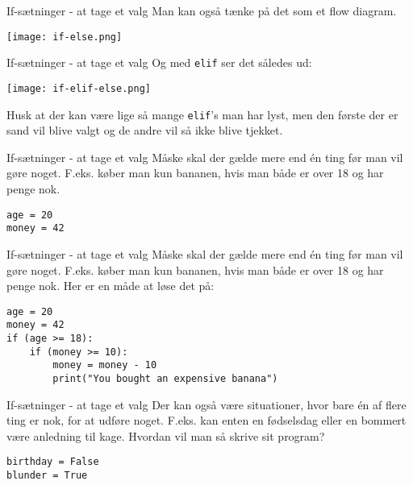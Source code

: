 \documentclass[main.tex]{subfiles}
\begin{document}
\begin{frame}[fragile]{If-sætninger - at tage et valg}
Man kan også tænke på det som et flow diagram.
\begin{center}
\texttt{[image: if-else.png]}
\end{center}

\end{frame}


\begin{frame}[fragile]{If-sætninger - at tage et valg}
Og med \texttt{elif} ser det således ud:
\begin{center}
	\texttt{[image: if-elif-else.png]}
\end{center}

Husk at der kan være lige så mange \texttt{elif}'s man har lyst, men den første der er sand vil blive valgt og de andre vil så ikke blive tjekket.

\end{frame}


\begin{frame}[fragile]{If-sætninger - at tage et valg}
	Måske skal der gælde mere end én ting før man vil gøre noget. F.eks. køber man kun bananen, hvis man både er over 18 og har penge nok. 
	\begin{lstlisting}[style=python]
age = 20
money = 42
	\end{lstlisting}
\end{frame}

\begin{frame}[fragile]{If-sætninger - at tage et valg}
	Måske skal der gælde mere end én ting før man vil gøre noget. F.eks. køber man kun bananen, hvis man både er over 18 og har penge nok. Her er en måde at løse det på:
	\begin{lstlisting}[style=python]
age = 20
money = 42
if (age >= 18):
	if (money >= 10):
		money = money - 10
		print("You bought an expensive banana")
	\end{lstlisting}
\end{frame}

\begin{frame}[fragile]{If-sætninger - at tage et valg}
	Der kan også være situationer, hvor bare én af flere ting er nok, for at udføre noget. F.eks. kan enten en fødselsdag eller en bommert være anledning til kage. Hvordan vil man så skrive sit program?
	\begin{lstlisting}[style=python]
birthday = False
blunder = True
	\end{lstlisting}
\end{frame}
\end{document}
